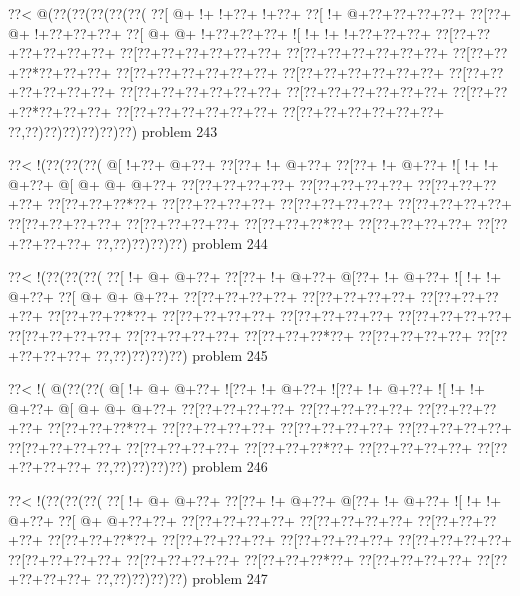 \vbox{\vbox{\goo
\0??<\- @(\0??(\0??(\0??(\0??(\0??(
\0??[\- @+\- !+\- !+\0??+\- !+\0??+
\0??[\- !+\- @+\0??+\0??+\0??+\0??+
\0??[\0??+\- @+\- !+\0??+\0??+\0??+
\0??[\- @+\- @+\- !+\0??+\0??+\0??+
\- ![\- !+\- !+\- !+\0??+\0??+\0??+
\0??[\0??+\0??+\0??+\0??+\0??+\0??+
\0??[\0??+\0??+\0??+\0??+\0??+\0??+
\0??[\0??+\0??+\0??+\0??+\0??+\0??+
\0??[\0??+\0??+\0??*\0??+\0??+\0??+
\0??[\0??+\0??+\0??+\0??+\0??+\0??+
\0??[\0??+\0??+\0??+\0??+\0??+\0??+
\0??[\0??+\0??+\0??+\0??+\0??+\0??+
\0??[\0??+\0??+\0??+\0??+\0??+\0??+
\0??[\0??+\0??+\0??+\0??+\0??+\0??+
\0??[\0??+\0??+\0??*\0??+\0??+\0??+
\0??[\0??+\0??+\0??+\0??+\0??+\0??+
\0??[\0??+\0??+\0??+\0??+\0??+\0??+
\0??,\0??)\0??)\0??)\0??)\0??)\0??)
}
\hfil problem 243\hfil\break
}

\vbox{\vbox{\goo
\0??<\- !(\0??(\0??(\0??(
\- @[\- !+\0??+\- @+\0??+
\0??[\0??+\- !+\- @+\0??+
\0??[\0??+\- !+\- @+\0??+
\- ![\- !+\- !+\- @+\0??+
\- @[\- @+\- @+\- @+\0??+
\0??[\0??+\0??+\0??+\0??+
\0??[\0??+\0??+\0??+\0??+
\0??[\0??+\0??+\0??+\0??+
\0??[\0??+\0??+\0??*\0??+
\0??[\0??+\0??+\0??+\0??+
\0??[\0??+\0??+\0??+\0??+
\0??[\0??+\0??+\0??+\0??+
\0??[\0??+\0??+\0??+\0??+
\0??[\0??+\0??+\0??+\0??+
\0??[\0??+\0??+\0??*\0??+
\0??[\0??+\0??+\0??+\0??+
\0??[\0??+\0??+\0??+\0??+
\0??,\0??)\0??)\0??)\0??)
}
\hfil problem 244\hfil\break
}

\vbox{\vbox{\goo
\0??<\- !(\0??(\0??(\0??(
\0??[\- !+\- @+\- @+\0??+
\0??[\0??+\- !+\- @+\0??+
\- @[\0??+\- !+\- @+\0??+
\- ![\- !+\- !+\- @+\0??+
\0??[\- @+\- @+\- @+\0??+
\0??[\0??+\0??+\0??+\0??+
\0??[\0??+\0??+\0??+\0??+
\0??[\0??+\0??+\0??+\0??+
\0??[\0??+\0??+\0??*\0??+
\0??[\0??+\0??+\0??+\0??+
\0??[\0??+\0??+\0??+\0??+
\0??[\0??+\0??+\0??+\0??+
\0??[\0??+\0??+\0??+\0??+
\0??[\0??+\0??+\0??+\0??+
\0??[\0??+\0??+\0??*\0??+
\0??[\0??+\0??+\0??+\0??+
\0??[\0??+\0??+\0??+\0??+
\0??,\0??)\0??)\0??)\0??)
}
\hfil problem 245\hfil\break
}

\vbox{\vbox{\goo
\0??<\- !(\- @(\0??(\0??(
\- @[\- !+\- @+\- @+\0??+
\- ![\0??+\- !+\- @+\0??+
\- ![\0??+\- !+\- @+\0??+
\- ![\- !+\- !+\- @+\0??+
\- @[\- @+\- @+\- @+\0??+
\0??[\0??+\0??+\0??+\0??+
\0??[\0??+\0??+\0??+\0??+
\0??[\0??+\0??+\0??+\0??+
\0??[\0??+\0??+\0??*\0??+
\0??[\0??+\0??+\0??+\0??+
\0??[\0??+\0??+\0??+\0??+
\0??[\0??+\0??+\0??+\0??+
\0??[\0??+\0??+\0??+\0??+
\0??[\0??+\0??+\0??+\0??+
\0??[\0??+\0??+\0??*\0??+
\0??[\0??+\0??+\0??+\0??+
\0??[\0??+\0??+\0??+\0??+
\0??,\0??)\0??)\0??)\0??)
}
\hfil problem 246\hfil\break
}

\vbox{\vbox{\goo
\0??<\- !(\0??(\0??(\0??(
\0??[\- !+\- @+\- @+\0??+
\0??[\0??+\- !+\- @+\0??+
\- @[\0??+\- !+\- @+\0??+
\- ![\- !+\- !+\- @+\0??+
\0??[\- @+\- @+\0??+\0??+
\0??[\0??+\0??+\0??+\0??+
\0??[\0??+\0??+\0??+\0??+
\0??[\0??+\0??+\0??+\0??+
\0??[\0??+\0??+\0??*\0??+
\0??[\0??+\0??+\0??+\0??+
\0??[\0??+\0??+\0??+\0??+
\0??[\0??+\0??+\0??+\0??+
\0??[\0??+\0??+\0??+\0??+
\0??[\0??+\0??+\0??+\0??+
\0??[\0??+\0??+\0??*\0??+
\0??[\0??+\0??+\0??+\0??+
\0??[\0??+\0??+\0??+\0??+
\0??,\0??)\0??)\0??)\0??)
}
\hfil problem 247\hfil\break
}

